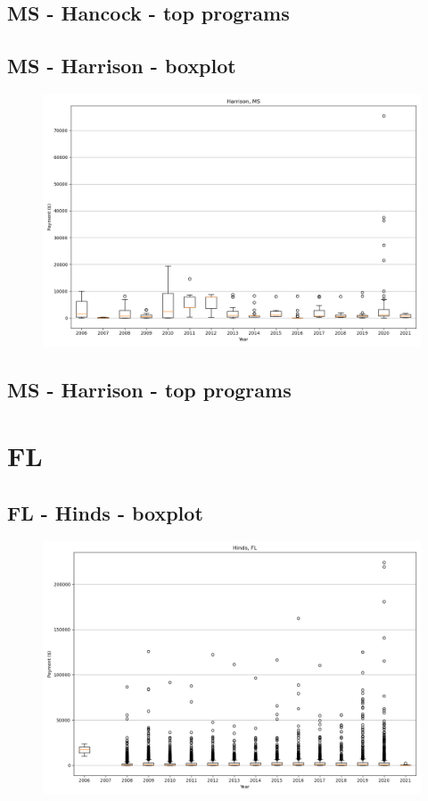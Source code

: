 \subsection*{MS - Hancock - top programs}

\newpage
\subsection*{MS - Harrison - boxplot}
\begin{figure}[h]
\centering
\includegraphics[width=7in]{../output/boxplots/counties/Harrison-MS_boxplot.png}
\end{figure}


\subsection*{MS - Harrison - top programs}

\newpage
\section*{FL}
\subsection*{FL - Hinds - boxplot}
\begin{figure}[h]
\centering
\includegraphics[width=7in]{../output/boxplots/counties/Hinds-FL_boxplot.png}
\end{figure}


